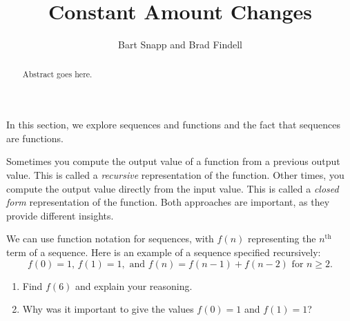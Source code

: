 \documentclass{ximera}
\title{Constant Amount Changes}
\author{Bart Snapp and Brad Findell}
\begin{document}
\begin{abstract}
Abstract goes here.  
\end{abstract}
\maketitle

\label{A:ConstantAmount}

In this section, we explore sequences and functions and the fact that sequences are functions. 

Sometimes you compute the output value of a function from a previous output value.  This is called a \emph{recursive} representation of the function.  Other times, you compute the output value directly from the input value.  This is called a \emph{closed form} representation of the function.  Both approaches are important, as they provide different insights.  

\begin{problem}
We can use function notation for sequences, with $f(n)$ representing the $n^\mathrm{th}$ term of a sequence.  Here is an example of a sequence specified recursively:  
$$f(0) = 1\text{, }f(1) = 1,\text{ and }f(n) = f(n-1)+f(n-2)\text{ for }n \ge 2.$$
\begin{enumerate}
\item Find $f(6)$ and explain your reasoning.  
\item Why was it important to give the values $f(0) = 1$ and $f(1) = 1$?  
\end{enumerate}
\end{problem}
\end{document}
